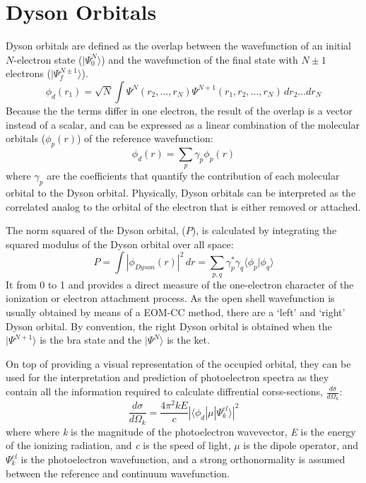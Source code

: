 \section{Dyson Orbitals}

Dyson orbitals\cite{jagau2016characterizing,melania2007dyson} are defined as the overlap between the wavefunction of an initial $N$-electron state ($|\Psi_0^N\rangle$) and the wavefunction of the final state with $N\pm1$ electrons ($|\Psi_f^{N\pm1}\rangle$).
\begin{equation}
    \phi_{d}(r_1) = \sqrt{N} \int \Psi^{N}(r_2,\dots,r_N) \Psi^{N+1}(r_1, r_2,\dots,r_N)\,dr_2 \dots dr_N
\end{equation}
Because the the terms differ in one electron, the result of the overlap is a vector instead of a scalar, and can be expressed as a linear combination of the molecular orbitals ($\phi_p(r)$) of the reference wavefunction:
\begin{equation}
    \phi_{d}(r) = \sum_p \gamma_p \phi_p(r)
\end{equation}
where $\gamma_p$ are the coefficients that quantify the contribution of each molecular orbital to the Dyson orbital. Physically, Dyson orbitals can be interpreted as the correlated analog to the orbital of the electron that is either removed or attached.

The norm squared of the Dyson orbital, ($P$), is calculated by integrating the squared modulus of the Dyson orbital over all space:
\begin{equation}
    P = \int |\phi_{Dyson}(r)|^2 \,dr = \sum_{p,q} \gamma_p^* \gamma_q \langle \phi_p | \phi_q \rangle
\end{equation}
It from 0 to 1 and provides a direct measure of the one-electron character of the ionization or electron attachment process. As the open shell wavefunction is usually obtained by means of a EOM-CC method, there are a `left' and `right' Dyson orbital. By convention, the right Dyson orbital is obtained when the $|\Psi^{N+1}\rangle$ is the bra state and the $|\Psi^{N}\rangle$ is the ket. 

On top of providing a visual representation of the occupied orbital, they can be used for the interpretation and prediction of photoelectron spectra as they contain all the information required to calculate diffrential corss-sections, $\frac{d\sigma}{d\Omega_k}$:
\begin{equation}
    \frac{d\sigma}{d\Omega_k} = \frac{4\pi^2kE}{c}|\langle \phi_d | \mu | \Psi^{el}_k \rangle |^2
\end{equation}
where where \textit{k} is the magnitude of the photoelectron wavevector, \textit{E} is the energy of the ionizing radiation, and \textit{c} is the speed of light, $\mu$ is the dipole operator, and $\Psi^{el}_k$ is the photoelectron wavefunction, and a strong orthonormality is assumed between the reference and continuum wavefunction.  

